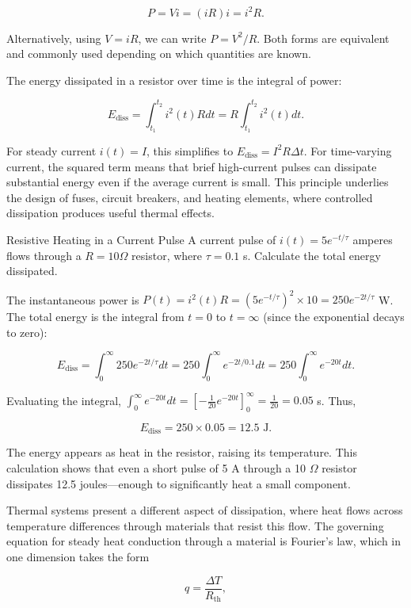 $$P = V i = (i R) i = i^2 R.$$

Alternatively, using $V = i R$, we can write $P = V^2/R$. Both forms are equivalent and commonly used depending on which quantities are known.

The energy dissipated in a resistor over time is the integral of power:

$$E_{\text{diss}} = \int_{t_1}^{t_2} i^2(t) R  dt = R \int_{t_1}^{t_2} i^2(t)  dt.$$

For steady current $i(t) = I$, this simplifies to $E_{\text{diss}} = I^2 R \Delta t$. For time-varying current, the squared term means that brief high-current pulses can dissipate substantial energy even if the average current is small. This principle underlies the design of fuses, circuit breakers, and heating elements, where controlled dissipation produces useful thermal effects.

\begin{example}{Resistive Heating in a Current Pulse}
A current pulse of $i(t) = 5 e^{-t/\tau}$ amperes flows through a $R = 10 \Omega$ resistor, where $\tau = 0.1$ s. Calculate the total energy dissipated.

The instantaneous power is $P(t) = i^2(t) R = (5 e^{-t/\tau})^2 \times 10 = 250 e^{-2t/\tau}$ W. The total energy is the integral from $t = 0$ to $t = \infty$ (since the exponential decays to zero):

$$E_{\text{diss}} = \int_0^\infty 250 e^{-2t/\tau}  dt = 250 \int_0^\infty e^{-2t/0.1}  dt = 250 \int_0^\infty e^{-20t}  dt.$$

Evaluating the integral, $\int_0^\infty e^{-20t}  dt = \left[ -\frac{1}{20} e^{-20t} \right]_0^\infty = \frac{1}{20} = 0.05$ s. Thus,

$$E_{\text{diss}} = 250 \times 0.05 = 12.5 \text{ J}.$$

The energy appears as heat in the resistor, raising its temperature. This calculation shows that even a short pulse of 5 A through a 10 $\Omega$ resistor dissipates 12.5 joules—enough to significantly heat a small component.
\end{example}

Thermal systems present a different aspect of dissipation, where heat flows across temperature differences through materials that resist this flow. The governing equation for steady heat conduction through a material is Fourier's law, which in one dimension takes the form

$$q = \frac{\Delta T}{R_{\text{th}}},$$

